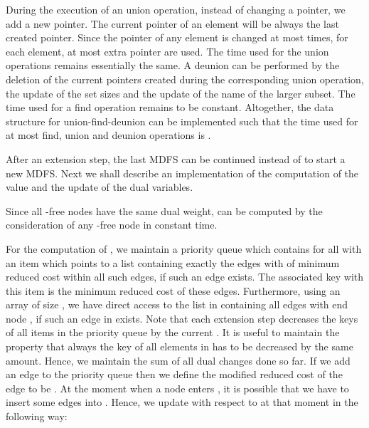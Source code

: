 \documentclass[12pt,twoside,a4paper]{article}
\begin{document}
During the execution of an union operation, instead of changing a pointer, we add a
new pointer. The current pointer of an element will be always the last created pointer.
Since the pointer of any element is changed at most  times, for each element, 
at most  extra pointer are used. The time used for the union operations
remains essentially the same. A deunion can be performed by the deletion of the current 
pointers created during the corresponding union operation, the update of the set sizes 
and the update of the name of the larger subset. The time used for a find operation
remains to be constant. Altogether, the data structure for 
union-find-deunion can be implemented such that the time used for at most  find,
 union and  deunion operations is .

After an extension step, the last MDFS can be continued instead of
to start a new MDFS. 
Next we shall describe an implementation of the computation of the value  and
the update of the dual variables.

\medskip
Since all -free nodes  have the same dual weight, 
can be computed by the consideration of any -free node in constant time.

For the computation of , we maintain a priority queue 
which contains for all  with  an item
which points to a list containing exactly the edges  with 
of minimum reduced cost within all such edges, if such an edge exists. The 
associated key with this item is the minimum reduced cost of these edges.
Furthermore, using an array of size , we have direct access to the list in  
containing all edges with end node , if such an edge in  exists.
Note that each extension step decreases the keys of all items in the
priority queue by the current . It is useful to maintain the property
that always the key of all elements in  has to be decreased by the same
amount. Hence, we maintain the sum  of all dual changes
done so far. If we add an edge  to the priority queue then we define
the modified reduced cost of the edge to be .
At the moment when a node  enters , it is possible that we have to insert some
edges into . Hence, we update  with respect to  
at that moment in the following way:
\end{document}
